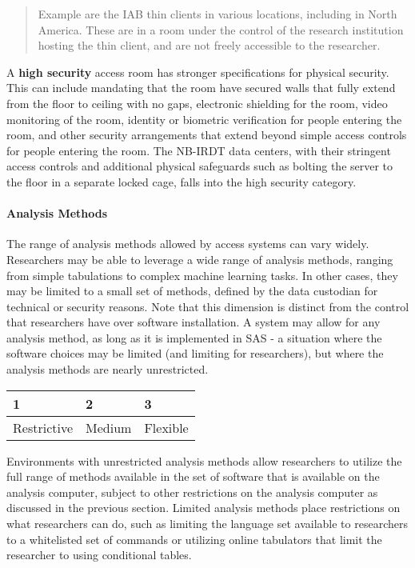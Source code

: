 \begin{quote}
Example are the IAB thin clients in various locations, including in
North America. These are in a room under the control of the research
institution hosting the thin client, and are not freely accessible to
the researcher.
\end{quote}

A \textbf{high security} access room has stronger specifications for
physical security. This can include mandating that the room have secured
walls that fully extend from the floor to ceiling with no gaps,
electronic shielding for the room, video monitoring of the room,
identity or biometric verification for people entering the room, and
other security arrangements that extend beyond simple access controls
for people entering the room. The NB-IRDT data centers, with their
stringent access controls and additional physical safeguards such as
bolting the server to the floor in a separate locked cage, falls into
the high security category.

\hypertarget{analysis-methods}{%
\paragraph{Analysis Methods}\label{analysis-methods}}

The range of analysis methods allowed by access systems can vary widely.
Researchers may be able to leverage a wide range of analysis methods,
ranging from simple tabulations to complex machine learning tasks. In
other cases, they may be limited to a small set of methods, defined by
the data custodian for technical or security reasons. Note that this
dimension is distinct from the control that researchers have over
software installation. A system may allow for any analysis method, as
long as it is implemented in SAS - a situation where the software
choices may be limited (and limiting for researchers), but where the
analysis methods are nearly unrestricted.

\begin{longtable}[]{@{}lll@{}}
\toprule
1 & 2 & 3\tabularnewline
\midrule
\endhead
Restrictive & Medium & Flexible\tabularnewline
\bottomrule
\end{longtable}

Environments with unrestricted analysis methods allow researchers to
utilize the full range of methods available in the set of software that
is available on the analysis computer, subject to other restrictions on
the analysis computer as discussed in the previous section. Limited
analysis methods place restrictions on what researchers can do, such as
limiting the language set available to researchers to a whitelisted set
of commands or utilizing online tabulators that limit the researcher to
using conditional tables.

